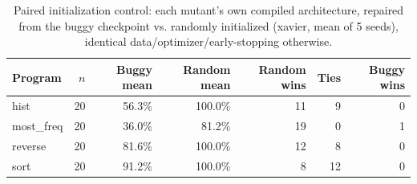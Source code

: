 \begin{table}[t]
\centering
\caption{Paired initialization control: each mutant's own compiled architecture, repaired from the buggy checkpoint vs. randomly initialized (xavier, mean of 5 seeds), identical data/optimizer/early-stopping otherwise.}
\label{tab:paired-init-control}
\begin{tabular}{lrrrrrr}
\toprule
Program & $n$ & Buggy mean & Random mean & Random wins & Ties & Buggy wins \\
\midrule
hist & 20 & 56.3\% & 100.0\% & 11 & 9 & 0 \\
most_freq & 20 & 36.0\% & 81.2\% & 19 & 0 & 1 \\
reverse & 20 & 81.6\% & 100.0\% & 12 & 8 & 0 \\
sort & 20 & 91.2\% & 100.0\% & 8 & 12 & 0 \\
\bottomrule
\end{tabular}
\end{table}
